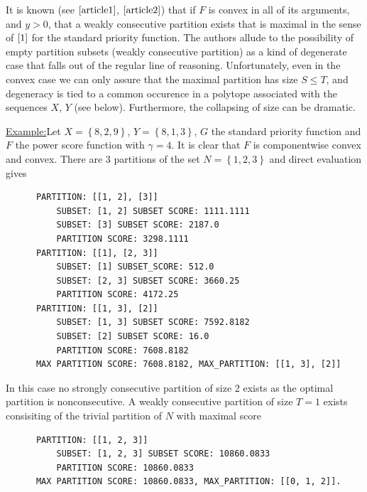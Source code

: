 \documentclass{article}
\theoremstyle{case}
\newenvironment{example}[1]{\par\noindent\underline{Example:}\space#1}{}
\begin{document}
It is known (see $\cite{article1}$, $\cite{article2}$) that if $F$ is convex in all of its arguments, and $y > 0$, that a weakly consecutive partition exists that is maximal in the sense of $\ref{1}$ for the standard priority function. The authors allude to the possibility of empty partition subsets (weakly consecutive partition) as a kind of degenerate case that falls out of the regular line of reasoning. Unfortunately, even in the convex case we can only assure that the maximal partition has size $S \leq T$, and degeneracy is tied to a common occurence in a polytope associated with the sequences $X$, $Y$ (see below). Furthermore, the collapsing of size can be dramatic.

\vspace{4pt}

\begin{example}
Let $X = \left\lbrace 8, 2, 9\right\rbrace$, $Y = \left\lbrace  8, 1, 3\right\rbrace$, $G$ the standard priority function and $F$ the power score function with $\gamma = 4$. It is clear that $F$ is componentwise convex and convex. There are 3 partitions of the set $N = \left\lbrace 1,2,3 \right\rbrace$ and direct evaluation gives
\begin{verbatim}
      PARTITION: [[1, 2], [3]]
          SUBSET: [1, 2] SUBSET SCORE: 1111.1111
          SUBSET: [3] SUBSET SCORE: 2187.0
          PARTITION SCORE: 3298.1111
      PARTITION: [[1], [2, 3]]
          SUBSET: [1] SUBSET_SCORE: 512.0
          SUBSET: [2, 3] SUBSET SCORE: 3660.25
          PARTITION SCORE: 4172.25
      PARTITION: [[1, 3], [2]]
          SUBSET: [1, 3] SUBSET SCORE: 7592.8182
          SUBSET: [2] SUBSET SCORE: 16.0
          PARTITION SCORE: 7608.8182
      MAX PARTITION SCORE: 7608.8182, MAX_PARTITION: [[1, 3], [2]]
\end{verbatim}
In this case no strongly consecutive partition of size 2 exists as the optimal partition is nonconsecutive. A weakly consecutive partition of size $T = 1$ exists consisiting of the trivial partition of $N$ with maximal score
\begin{verbatim}
      PARTITION: [[1, 2, 3]]
          SUBSET: [1, 2, 3] SUBSET SCORE: 10860.0833
          PARTITION SCORE: 10860.0833
      MAX PARTITION SCORE: 10860.0833, MAX_PARTITION: [[0, 1, 2]].
\end{verbatim}  
\end{example}
\end{document}
